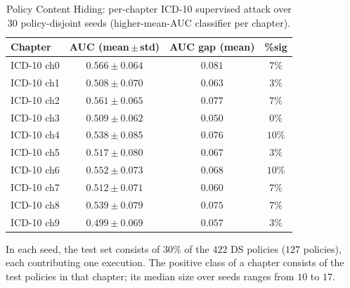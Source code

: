 \begin{table}[htbp]
	\centering
	\caption{Policy Content Hiding: per-chapter ICD-10 supervised attack over 30
		policy-disjoint seeds (higher-mean-AUC classifier per chapter).}
	\label{tab:pch-icd10}
	\begin{tabular}{lccc}
		\toprule
		Chapter & AUC (mean\,$\pm$\,std) & AUC gap (mean) & \%sig  \\
		\midrule
		ICD-10 ch0 & $0.566 \pm 0.064$      & $0.081$        & $7\%$ \\
		ICD-10 ch1 & $0.508 \pm 0.070$      & $0.063$        & $3\%$ \\
		ICD-10 ch2 & $0.561 \pm 0.065$      & $0.077$        & $7\%$ \\
		ICD-10 ch3 & $0.509 \pm 0.062$      & $0.050$        & $0\%$ \\
		ICD-10 ch4 & $0.538 \pm 0.085$      & $0.076$        & $10\%$ \\
		ICD-10 ch5 & $0.517 \pm 0.080$      & $0.067$        & $3\%$ \\
		ICD-10 ch6 & $0.552 \pm 0.073$      & $0.068$        & $10\%$ \\
		ICD-10 ch7 & $0.512 \pm 0.071$      & $0.060$        & $7\%$ \\
		ICD-10 ch8 & $0.539 \pm 0.079$      & $0.075$        & $7\%$ \\
		ICD-10 ch9 & $0.499 \pm 0.069$      & $0.057$        & $3\%$ \\
		\bottomrule
	\end{tabular}
	\begin{tablenote}
		In each seed, the test set consists of $30\%$ of the $422$ DS policies ($127$ policies), each contributing one execution. The positive class of a chapter consists of the test policies in that chapter; its median size over seeds ranges from $10$ to $17$.
	\end{tablenote}
\end{table}
